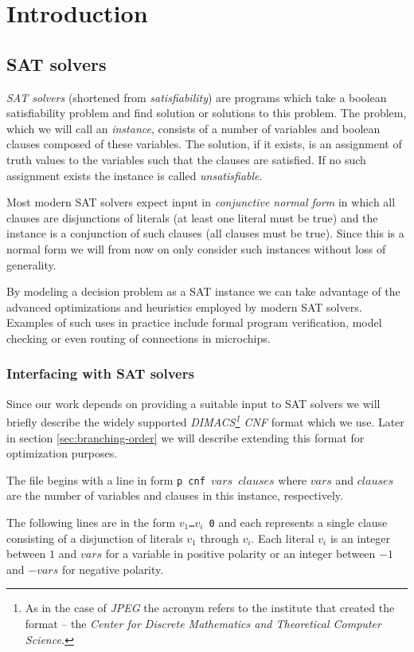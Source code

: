 \section{Introduction}

\subsection{SAT solvers}
\emph{SAT solvers} (shortened from \emph{satisfiability}) are programs which take a boolean satisfiability problem and find solution or solutions to this problem.
The problem, which we will call an \emph{instance}, consists of a number of variables and boolean clauses composed of these variables.
The solution, if it exists, is an assignment of truth values to the variables such that the clauses are satisfied.
If no such assignment exists the instance is called \emph{unsatisfiable}.

Most modern SAT solvers expect input in \emph{conjunctive normal form} in which all clauses are disjunctions of literals (at least one literal must be true) and the instance is a conjunction of such clauses (all clauses must be true).
Since this is a normal form we will from now on only consider such instances without loss of generality.

By modeling a decision problem as a SAT instance we can take advantage of the advanced optimizations and heuristics employed by modern SAT solvers.
Examples of such uses in practice include formal program verification, model checking or even routing of connections in microchips.

\subsubsection{Interfacing with SAT solvers}
\label{sec:dimacs}
Since our work depends on providing a suitable input to SAT solvers we will briefly describe the widely supported \emph{DIMACS\footnote{As in the case of \emph{JPEG} the acronym refers to the institute that created the format -- the \emph{Center for Discrete Mathematics and Theoretical Computer Science.}} CNF} format which we use.
Later in section \ref{sec:branching-order} we will describe extending this format for optimization purposes.

The file begins with a line in form \texttt{p cnf $vars$ $clauses$} where $vars$ and $clauses$ are the number of variables and clauses in this instance, respectively.

The following lines are in the form \texttt{$v_1$\dots$v_i$ 0} and each represents a single clause consisting of a disjunction of literals $v_1$ through $v_i$.
Each literal $v_i$ is an integer between $1$ and $vars$ for a variable in positive polarity or an integer between $-1$ and $-vars$ for negative polarity.


